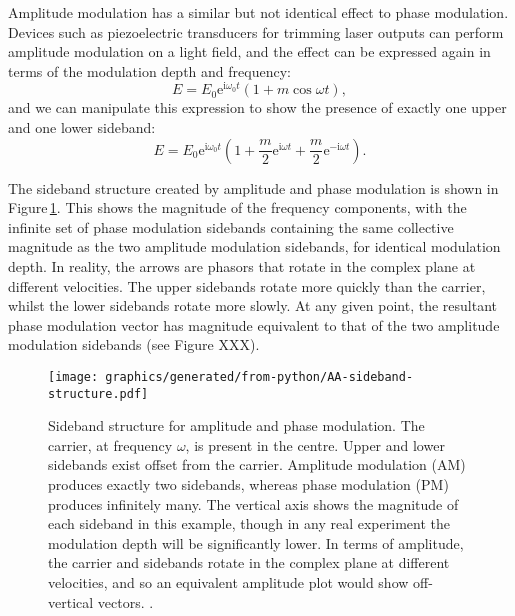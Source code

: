 Amplitude modulation has a similar but not identical effect to phase modulation. Devices such as piezoelectric transducers for trimming laser outputs can perform amplitude modulation on a light field, and the effect can be expressed again in terms of the modulation depth and frequency:
\begin{equation}
  E = E_0 \text{e}^{\text{i} \omega_0 t} \left( 1 + m \cos{\omega t} \right),
\end{equation}
and we can manipulate this expression to show the presence of exactly one upper and one lower sideband:
\begin{equation}
  \label{eq:field-amp-mod}
  E = E_0 \text{e}^{\text{i} \omega_0 t} \left( 1 + \frac{m}{2} \text{e}^{\text{i} \omega t} + \frac{m}{2} \text{e}^{-\text{i} \omega t} \right).
\end{equation}

The sideband structure created by amplitude and phase modulation is shown in Figure\,\ref{fig:sideband-structure}. This shows the magnitude of the frequency components, with the infinite set of phase modulation sidebands containing the same collective magnitude as the two amplitude modulation sidebands, for identical modulation depth. In reality, the arrows are phasors that rotate in the complex plane at different velocities. The upper sidebands rotate more quickly than the carrier, whilst the lower sidebands rotate more slowly. At any given point, the resultant phase modulation vector has magnitude equivalent to that of the two amplitude modulation sidebands (see Figure XXX).

\begin{figure}
  \centering
  \texttt{[image: graphics/generated/from-python/AA-sideband-structure.pdf]}
  \caption[Sideband structure for amplitude and phase modulation]{Sideband structure for amplitude and phase modulation. The carrier, at frequency $\omega$, is present in the centre. Upper and lower sidebands exist offset from the carrier. Amplitude modulation (AM) produces exactly two sidebands, whereas phase modulation (PM) produces infinitely many. The vertical axis shows the magnitude of each sideband in this example, though in any real experiment the modulation depth will be significantly lower. In terms of amplitude, the carrier and sidebands rotate in the complex plane at different velocities, and so an equivalent amplitude plot would show off-vertical vectors. . }
  \label{fig:sideband-structure}
\end{figure}

